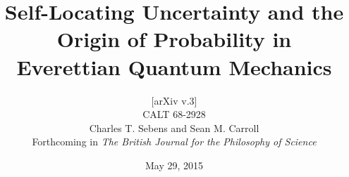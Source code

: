 \documentclass[onecolumn,secnumarabic,amsmath,amssymb,balancelastpage,nofootinbib]{article}
\begin{document}




\title{Self-Locating Uncertainty and the Origin of Probability in\vspace*{-.1cm}\\Everettian Quantum Mechanics\vspace*{-.3cm}}
\author         {\small{[arXiv v.3]}\vspace*{-.1cm}\\\small{CALT 68-2928}\vspace{0.25cm}\\Charles T. Sebens and Sean M. Carroll\vspace*{0.2cm}\\Forthcoming in \emph{The British Journal for the Philosophy of Science}\vspace{0.1cm}}
\date{May 29, 2015}
\end{document}
